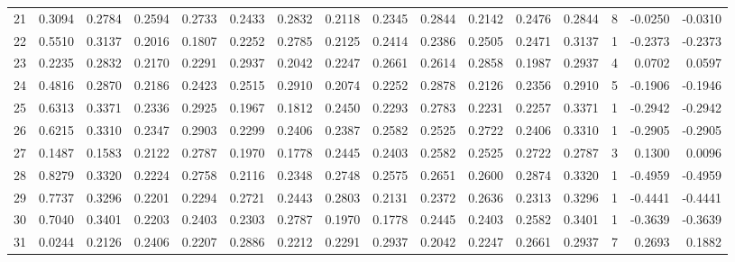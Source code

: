 \begin{tabular}{lrrrrrrrrrrrrrrr}
21  &      0.3094 &  0.2784 &  0.2594 &  0.2733 &  0.2433 &  0.2832 &  0.2118 &  0.2345 &  0.2844 &  0.2142 &   0.2476 &     0.2844 &      8 &                   -0.0250 &                    -0.0310 \\
22  &      0.5510 &  0.3137 &  0.2016 &  0.1807 &  0.2252 &  0.2785 &  0.2125 &  0.2414 &  0.2386 &  0.2505 &   0.2471 &     0.3137 &      1 &                   -0.2373 &                    -0.2373 \\
23  &      0.2235 &  0.2832 &  0.2170 &  0.2291 &  0.2937 &  0.2042 &  0.2247 &  0.2661 &  0.2614 &  0.2858 &   0.1987 &     0.2937 &      4 &                    0.0702 &                     0.0597 \\
24  &      0.4816 &  0.2870 &  0.2186 &  0.2423 &  0.2515 &  0.2910 &  0.2074 &  0.2252 &  0.2878 &  0.2126 &   0.2356 &     0.2910 &      5 &                   -0.1906 &                    -0.1946 \\
25  &      0.6313 &  0.3371 &  0.2336 &  0.2925 &  0.1967 &  0.1812 &  0.2450 &  0.2293 &  0.2783 &  0.2231 &   0.2257 &     0.3371 &      1 &                   -0.2942 &                    -0.2942 \\
26  &      0.6215 &  0.3310 &  0.2347 &  0.2903 &  0.2299 &  0.2406 &  0.2387 &  0.2582 &  0.2525 &  0.2722 &   0.2406 &     0.3310 &      1 &                   -0.2905 &                    -0.2905 \\
27  &      0.1487 &  0.1583 &  0.2122 &  0.2787 &  0.1970 &  0.1778 &  0.2445 &  0.2403 &  0.2582 &  0.2525 &   0.2722 &     0.2787 &      3 &                    0.1300 &                     0.0096 \\
28  &      0.8279 &  0.3320 &  0.2224 &  0.2758 &  0.2116 &  0.2348 &  0.2748 &  0.2575 &  0.2651 &  0.2600 &   0.2874 &     0.3320 &      1 &                   -0.4959 &                    -0.4959 \\
29  &      0.7737 &  0.3296 &  0.2201 &  0.2294 &  0.2721 &  0.2443 &  0.2803 &  0.2131 &  0.2372 &  0.2636 &   0.2313 &     0.3296 &      1 &                   -0.4441 &                    -0.4441 \\
30  &      0.7040 &  0.3401 &  0.2203 &  0.2403 &  0.2303 &  0.2787 &  0.1970 &  0.1778 &  0.2445 &  0.2403 &   0.2582 &     0.3401 &      1 &                   -0.3639 &                    -0.3639 \\
31  &      0.0244 &  0.2126 &  0.2406 &  0.2207 &  0.2886 &  0.2212 &  0.2291 &  0.2937 &  0.2042 &  0.2247 &   0.2661 &     0.2937 &      7 &                    0.2693 &                     0.1882 \\

\end{tabular}
